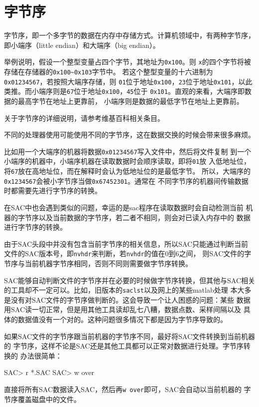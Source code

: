 \section{字节序}
字节序，即一个多字节的数据在内存中存储方式。计算机领域中，有两种字节序，
即小端序（little endian）和大端序（big endian）。

举例说明，假设一个整型变量占四个字节，其地址为\verb+0x100+。则
\verb+x+的四个字节将被存储在存储器的\verb+0x100~0x103+字节中。
若这个整型变量的十六进制为\verb+0x01234567+，若按照大端序存储，则
\verb+01+位于地址\verb+0x100+，\verb+23+位于地址\verb+0x101+，以此
类推。而小端序则是\verb+67+位于地址\verb+0x100+，\verb+45+位于
\verb+0x101+。直观的来看，大端序即数据的最高字节在地址上更靠前，
小端序则是数据的最低字节在地址上更靠前。

关于字节序的详细说明，请参考维基百科相关条目。

不同的处理器使用可能使用不同的字节序，这在数据交换的时候会带来很多麻烦。

比如用一个大端序的机器将数据\verb+0x01234567+写入文件中，然后将文件复制
到一个小端序的机器中，小端序机器在读取数据时会顺序读取，即将\verb+01+放
入低地址位，将\verb+67+放在高地址位，而在解释时会认为低地址位的是最低字节。
所以，大端序的\verb+0x1234567+会被小字节序当做\verb+0x67452301+。通常在
不同字节序的机器间传输数据时都需要先进行字节序的转换。

在SAC中也会遇到类似的问题，幸运的是sac程序在读取数据时会自动检测当前
机器的字节序以及当前数据的字节序，若二者不相同，则会对已读入内存中的
数据进行字节序的转换。

由于SAC头段中并没有包含当前字节序的相关信息，所以SAC只能通过判断当前
文件的SAC版本号，即\verb+nvhdr+来判断，若\verb+nvhdr+的值在0到6之间，
则SAC文件的字节序与当前机器字节序相同，否则不同则需要做字节序转换。

SAC能够自动判断文件的字节序并在必要的时候做字节序转换，但其他与SAC相关
的工具却不一定可以。比如，旧版本的\verb+saclst+以及网上的某些matlab处理
本大多是没有对SAC文件的字节序做判断的。这会导致一个让人困惑的问题：某些
数据用SAC读一切正常，但是用其他工具读却乱七八糟，数据点数、采样间隔以及
具体的数据值没有一个对的。这种问题很多情况下都是因为字节序导致的。

如果SAC文件的字节序跟当前机器的字节序不同，最好将SAC文件转换到当前机器的
字节序，这样不论是SAC还是其他工具都可以正常对数据进行处理。字节序转换的
办法很简单：
\begin{SACCode}
SAC> r *.SAC
SAC> w over
\end{SACCode}
直接将所有SAC数据读入SAC，然后再\verb+w over+即可，SAC会自动以当前机器的
字节序覆盖磁盘中的文件。
